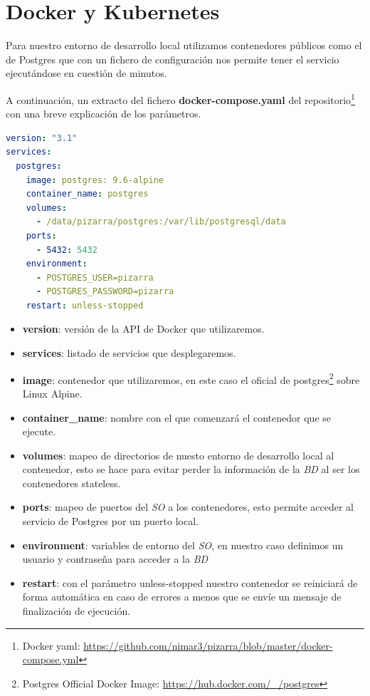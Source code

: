 \documentclass[11pt,spanish,listoffigures,listoftables]{tfgetsinf}
\begin{document}
\section{Docker y Kubernetes}

Para nuestro entorno de desarrollo local utilizamos contenedores públicos como el de Postgres que con un fichero de configuración nos permite tener el servicio ejecutándose en cuestión de minutos.

A continuación, un extracto del fichero \textbf{docker-compose.yaml} del repositorio\footnote{Docker yaml: \url{https://github.com/nimar3/pizarra/blob/master/docker-compose.yml}} con una breve explicación de los parámetros.

\begin{lstlisting}[language=yaml]
version: "3.1"
services:
  postgres:
    image: postgres: 9.6-alpine
    container_name: postgres
    volumes:
      - /data/pizarra/postgres:/var/lib/postgresql/data
    ports:
      - 5432: 5432
    environment:
      - POSTGRES_USER=pizarra
      - POSTGRES_PASSWORD=pizarra
    restart: unless-stopped
\end{lstlisting}

\begin{itemize}
	\item \textbf{version}: versión de la API de Docker que utilizaremos.
	\item \textbf{services}: listado de servicios que desplegaremos.
	\item \textbf{image}: contenedor que utilizaremos, en este caso el oficial de postgres\footnote{Postgres Official Docker Image: \url{https://hub.docker.com/_/postgres}} sobre Linux Alpine.
	\item \textbf{container\_name}: nombre con el que comenzará el contenedor que se ejecute.
	\item \textbf{volumes}: mapeo de directorios de nuesto entorno de desarrollo local al contenedor, esto se hace para evitar perder la información de la \textit{BD} al ser los contenedores \foreignlanguage{english}{stateless}.
    \item \textbf{ports}: mapeo de puertos del \textit{SO} a los contenedores, esto permite acceder al servicio de Postgres por un puerto local.
	\item \textbf{environment}: variables de entorno del \textit{SO}, en nuestro caso definimos un usuario y contraseña para acceder a la \textit{BD}
	\item \textbf{restart}: con el parámetro \foreignlanguage{english}{unless-stopped} nuestro contenedor se reiniciará de forma automática en caso de errores a menos que se envíe un mensaje de finalización de ejecución.
\end{itemize}
\end{document}
